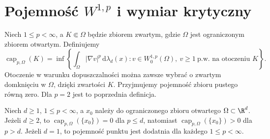 \section[Pojemność Sobolewa i wymiar krytyczny]{Pojemność $W^{1,p}$ i wymiar krytyczny}
\label{sec:pde19-p}
\begin{definicja}
Niech $1\le p<\infty$, a $K\Subset\Omega$ będzie zbiorem
zwartym, gdzie $\Omega$ jest ograniczonym zbiorem otwartym. Definiujemy
\[
 \operatorname{cap}_{p,\Omega}(K)=\inf\left\{
 \int_\Omega|\nabla v|^p\,\mathrm d\lambda_d(x):
 v\in W_0^{1,p}(\Omega),\ v\ge1\ \text{p.w. na otoczeniu }K\right\}.
\]
Otoczenie w warunku dopuszczalności można zawsze
wybrać o zwartym domknięciu w $\Omega$, dzięki zwartości
$K$. Przyjmujemy pojemność zbioru pustego równą zero.
Dla $p=2$ jest to poprzednia definicja.
\end{definicja}
\begin{twierdzenie}
\label{thm:pde19-point-p}
Niech $d\ge1$, $1\le p<\infty$, a $x_0$ należy do
ograniczonego zbioru otwartego $\Omega\subset\R^d$.
Jeżeli $d\ge2$, to
$\operatorname{cap}_{p,\Omega}(\{x_0\})=0$ dla $p\le d$,
natomiast $\operatorname{cap}_{p,\Omega}(\{x_0\})>0$
dla $p>d$. Jeżeli $d=1$, to pojemność punktu jest dodatnia
dla każdego $1\le p<\infty$.
\end{twierdzenie}
